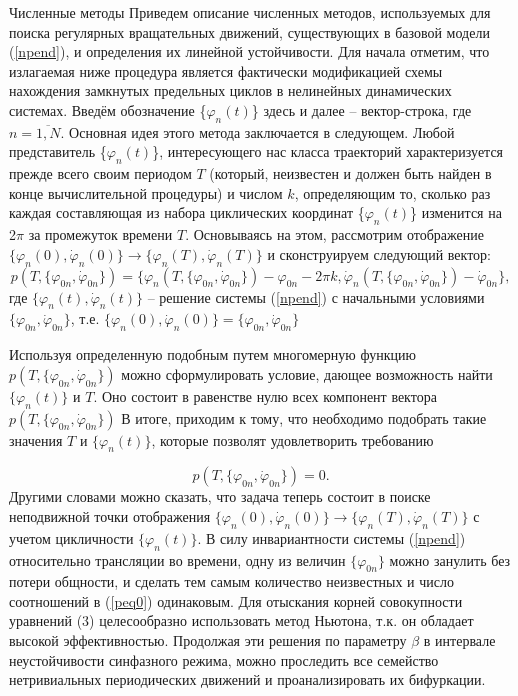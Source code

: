 \begin{chapter}{Численные методы}
Приведем описание численных методов, используемых для поиска регулярных 
вращательных движений, существующих в базовой модели (\ref{npend}), и определения 
их линейной устойчивости. Для начала отметим, что излагаемая ниже процедура 
является фактически модификацией схемы нахождения замкнутых предельных циклов 
в нелинейных динамических системах. Введём обозначение \{$ \varphi_n(t)$\} здесь и далее -- 
вектор-строка, где $n=\overline{1,N}$.
Основная идея этого метода заключается в следующем.
Любой представитель \{$ \varphi_n(t)$\}, интересующего нас класса траекторий характеризуется 
прежде всего своим периодом $T$ (который, неизвестен и должен быть 
найден в конце вычислительной процедуры) и числом $ k $, определяющим то, сколько раз 
каждая составляющая из набора циклических координат \{$ \varphi_n(t)$\} изменится на 2$\pi$ за 
промежуток времени $T$. Основываясь на этом, рассмотрим отображение  $\{ \varphi_n(0), \dot{\varphi}_n(0) \} \to \{ \varphi_n(T), \dot{\varphi}_n(T) \} $
и сконструируем следующий вектор:
\begin{equation*}
	p(T,\{\varphi_{0n},\dot{\varphi}_{0n}\}) = \{ \varphi_n(T,\{ \varphi_{0n},\dot{\varphi}_{0n} \})  - \varphi_{0n} -2 \pi k, \dot{\varphi}_n(T,\{ \varphi_{0n},\dot{\varphi}_{0n} \})  - \dot{\varphi}_{0n} \},
\end{equation*}
где $\{ \varphi_n(t), \dot{\varphi}_n(t) \}$ -- решение системы (\ref{npend}) с начальными условиями $\{\varphi_{0n},\dot{\varphi}_{0n}\}$, т.е. \newline $ \{ \varphi_n(0), \dot{\varphi}_n(0) \}=\{\varphi_{0n},\dot{\varphi}_{0n}\} $

Используя определенную подобным путем многомерную функцию $p(T,\{\varphi_{0n},\dot{\varphi}_{0n}\})$ 
можно сформулировать условие, дающее 
возможность найти $\{\varphi_n(t)\} $ и $T$. 
Оно состоит в равенстве нулю всех компонент вектора $p(T,\{\varphi_{0n},\dot{\varphi}_{0n}\})$ 
В итоге, приходим к тому, что необходимо подобрать такие 
значения $T$ и $\{\varphi_n(t)\} $, которые позволят удовлетворить требованию

\begin{equation}\label{peq0}
	p(T,\{\varphi_{0n},\dot{\varphi}_{0n}\}) = 0.
\end{equation}
Другими словами можно сказать, что задача теперь 
состоит в поиске неподвижной точки отображения $\{ \varphi_n(0), \dot{\varphi}_n(0) \} \to \{ \varphi_n(T), \dot{\varphi}_n(T) \} $ с 
учетом цикличности $ \{\varphi_n(t)\} $. В силу инвариантности системы (\ref{npend}) 
относительно трансляции во времени, одну из величин $ \{ \varphi_{0n} \}$ можно 
занулить без потери общности, и сделать тем самым количество 
неизвестных и число соотношений в (\ref{peq0}) одинаковым. Для отыскания корней совокупности уравнений (3) целесообразно использовать метод Ньютона, т.к. он обладает высокой эффективностью.
Продолжая эти решения по параметру $\beta$ в интервале неустойчивости синфазного режима, можно проследить все семейство нетривиальных периодических движений и проанализировать их бифуркации.


\end{chapter}
